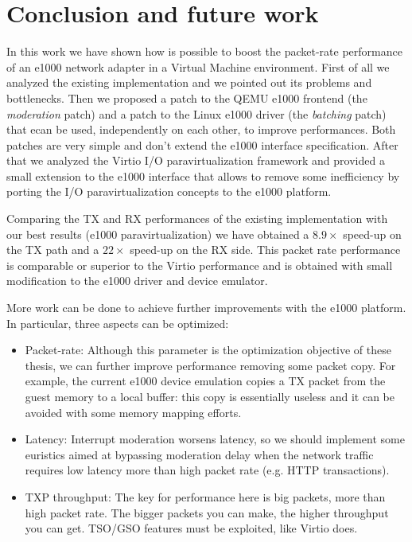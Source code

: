 \chapter*{Conclusion and future work}
In this work we have shown how is possible to boost the packet-rate performance of an e1000 network adapter in a Virtual
Machine environment.
First of all we analyzed the existing implementation and we pointed out its problems and bottlenecks.
Then we proposed a patch to the QEMU e1000 frontend (the \emph{moderation} patch) and a patch to the Linux e1000 driver (the \emph{batching}
patch) that ecan be used, independently on each other, to improve performances. Both patches are very simple and don't extend the e1000
interface specification.
After that we analyzed the Virtio I/O paravirtualization framework and provided a small extension to the e1000 interface that allows to remove
some inefficiency by porting the I/O paravirtualization concepts to the e1000 platform.

\vspace{0.5cm}

Comparing the TX and RX performances of the existing implementation with our best results (e1000 paravirtualization) we have obtained
a $8.9 \times$ speed-up on the TX path and a $22 \times$ speed-up on the RX side.
This packet rate performance is comparable or superior to the Virtio performance and is obtained with small modification to the e1000
driver and device emulator.

\vspace{0.5cm}

More work can be done to achieve further improvements with the e1000 platform. In particular, three aspects can be optimized:
\begin{itemize}
  \item Packet-rate: Although this parameter is the optimization objective of these thesis, we can further improve performance removing
	some packet copy. For example, the current e1000 device emulation copies a TX packet from the guest memory to a local buffer: this
	copy is essentially useless and it can be avoided with some memory mapping efforts.
	
  \item Latency: Interrupt moderation worsens latency, so we should implement some euristics aimed at bypassing moderation delay
	when the network traffic requires low latency more than high packet rate (e.g. HTTP transactions).
	
  \item TXP throughput: The key for performance here is big packets, more than high packet rate. The bigger packets you can make, the
	higher throughput you can get. TSO/GSO features must be exploited, like Virtio does.
\end{itemize}
